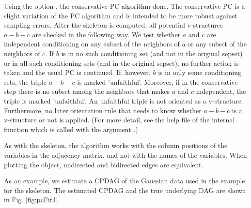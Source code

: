 \documentclass[article]{jss}
\begin{document}
Using the option , the conservative PC
algorithm done. The conservative PC is a slight variation of the PC
algorithm and is intended to be more robust against sampling errors. After
the skeleton is computed, all potential v-structures $a-b-c$ are checked in
the following way. We test whether $a$ and $c$ are independent conditioning
on any subset of the neighbors of a or any subset of the neighbors of
$c$. If $b$ is in no such conditioning set (and not in the original sepset)
or in all such conditioning sets (and in the original sepset), no further
action is taken and the usual PC is continued. If, however, $b$ is in only
some conditioning sets, the triple $a-b-c$ is marked
'unfaithful'. Moreover, if in the conservative step there is no subset
among the neighbors that makes $a$ and $c$ independent, the triple is
marked 'unfaithful'. An unfaithful triple is not oriented as a v-structure.
Furthermore, no later orientation rule that needs to know whether $a-b-c$
is a v-structure or not is applied. (For more detail, see the help file of
the internal function  which is called with the argument
.)  

As with the skeleton, the algorithm works with the column positions of the
variables in the adjacency matrix, and not with the names of the
variables. When plotting the object, undirected and bidirected edges are
equivalent.

As an example, we estimate a CPDAG of the Gaussian data used in the example
for the skeleton. The estimated CPDAG and the true underlying DAG are shown
in Fig. \ref{fig:pcFit1}.
\end{document}
